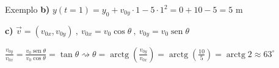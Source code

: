\documentclass{beamer}
\begin{document}
\begin{frame}{Exemplo }
		\vspace{0.2cm}
		\textbf{b)} $y(t=1) = y_0 + v_{0y} \cdot 1 - 5 \cdot 1^2 = 0 + 10 - 5 = 5 \text{ m}$
		
		\vspace{0.4cm}
		\textbf{c)} $\vec{v} = (v_{0x}, v_{0y}) \ , \ v_{0x} = v_0 \cos\theta \ , \ v_{0y} = v_0 \operatorname{sen}\theta$
		
		\vspace{0.3cm}
		$\frac{v_{0y}}{v_{0x}} = \frac{v_0 \operatorname{sen}\theta}{v_0 \cos\theta} = \tan\theta \rightsquigarrow \theta = \operatorname{arctg}\left(\frac{v_{0y}}{v_{0x}}\right) = \operatorname{arctg}\left(\frac{10}{5}\right) = \operatorname{arctg} 2 \approx 63^\circ$
		
	\end{frame}
	

\end{document}
